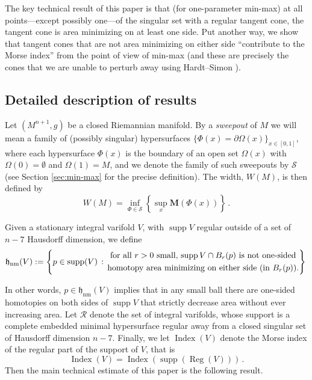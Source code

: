 \documentclass[12pt,twoside]{amsart}
\numberwithin{equation}{section}
\renewcommand{\cR}{\mathcal R}
\newcommand{\cS}{\mathcal S}
\newcommand{\bM}{\mathbf{M}}
\DeclareMathOperator{\supp}{supp}
\DeclareMathOperator{\Index}{Index}
\DeclareMathOperator{\reg}{Reg}
\begin{document}
The key technical result of this paper is that (for one-parameter min-max) at all points---except possibly one---of the singular set with a regular tangent cone, the tangent cone is area minimizing on at least one side. Put another way, we show that tangent cones that are not area minimizing on either side ``contribute to the Morse index'' from the point of view of min-max (and these are precisely the cones that we are unable to perturb away using Hardt--Simon \cite{HS}). 

\subsection{Detailed description of results} 
Let $(M^{n+1},g)$ be a closed Riemannian manifold. By a \emph{sweepout} of $M$ we will mean a family of (possibly singular) hypersurfaces $\{ \Phi(x)=\partial \Omega(x)\}_{x \in [0,1]}$, where each hypersurface $\Phi(x)$ is the boundary of an open set
$\Omega(x)$ with $\Omega(0) = \emptyset$ and $\Omega(1) = M$, and we denote the family of such sweepouts by $\cS$ (see Section \ref{sec:min-max} for the precise definition).
The width, $W(M)$, is then defined by 
\[
W(M) = \inf_{\Phi\in \cS} \left\{ \sup_x \bM(\Phi(x))\right\}\,.
\]



  Given a stationary integral varifold $V$, with $\supp V$ regular outside of a set of $n-7$ Hausdorff dimension, we define 
 \[
\mathfrak{h}_\textnormal{nm}(V):= \left\{ p\in \supp(V)\,:\,  \begin{gathered}
\textrm{for all $r>0$ small, $\supp V\cap B_r(p)$ is not one-sided} \\
\text{homotopy area minimizing on either side (in $B_r(p)$).}
\end{gathered}
\right\}\,
 \]
  
In other words, $p\in\mathfrak{h}_\textrm{nm}(V)$ implies that in any small ball there are one-sided homotopies on both sides of $\supp V$ that strictly decrease area without ever increasing area. 
Let $\cR$ denote the set of integral varifolds, 
whose support is a complete embedded minimal hypersurface regular away from a closed singular set of Hausdorff dimension $n-7$.
Finally, we let  $\Index(V)$ denote the Morse index of the regular part of the support of $V$, that is
$$
\Index (V)=\Index (\supp(\reg(V)))\,.
$$
Then the main technical estimate of this paper is the following result.
\end{document}
